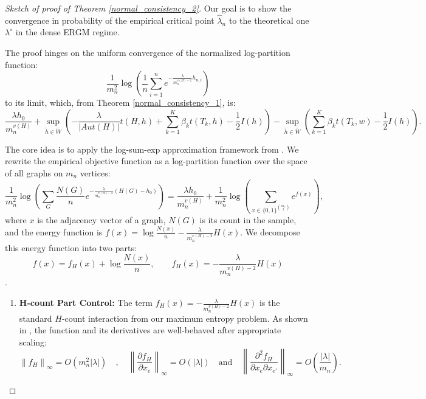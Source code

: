 \documentclass[12pt]{article}
\numberwithin{equation}{section}
\begin{document}
\begin{proof}[Sketch of proof of Theorem \ref{normal_consistency_2}]
 Our goal is to show the convergence in probability of the empirical critical point $\hat{\lambda}_n$ to the theoretical one $\lambda^{\circ}$ in the dense ERGM regime.

The proof hinges on the uniform convergence of the normalized log-partition function:
\[
\frac{1}{m_n^2}\log\left(\frac{1}{n}\sum_{i=1}^n e^{-\frac{\lambda}{m_n^{v(H)-2}} h_{n,i}}\right)
\]
to its limit, which, from Theorem \ref{normal_consistency_1}, is:
\[
\frac{\lambda h_0}{m_n^{v(H)}} + \sup_{\tilde{h}\in\tilde{W}}\left(-\frac{\lambda}{|Aut(H)|} t(H,h) + \sum_{k=1}^K \beta_k t(T_k, h) - \frac{1}{2}I(h) \right) - \sup_{\tilde{h}\in\tilde{W}}\left(\sum_{k=1}^K \beta_k t(T_k, w) - \frac{1}{2}I(h) \right).
\]

The core idea is to apply the log-sum-exp approximation framework from \cite{chatterjee2016nonlinear}. We rewrite the empirical objective function as a log-partition function over the space of all graphs on $m_n$ vertices:
\[
\frac{1}{m_n^2}\log\left(\sum_{G} \frac{N(G)}{n} e^{-\frac{\lambda}{m_n^{v(H)-2}} (H(G)-h_0)}\right) = \frac{\lambda h_0}{m_n^{v(H)}} + \frac{1}{m_n^2} \log \left(\sum_{x \in \{0,1\}^{\binom{m_n}{2}}} e^{f(x)}\right),
\]
where $x$ is the adjacency vector of a graph, $N(G)$ is its count in the sample, and the energy function is $f(x) = \log\frac{N(x)}{n} - \frac{\lambda}{m_n^{v(H)-2}} H(x)$. We decompose this energy function into two parts: 
$$f(x) = f_H(x) + \log\frac{N(x)}{n},\quad \quad f_H(x) = -\frac{\lambda}{m_n^{v(H)-2}}H(x)$$.

\begin{enumerate}
    \item \textbf{H-count Part Control:} The term $f_H(x) = -\frac{\lambda}{m_n^{v(H)-2}}H(x)$ is the standard $H$-count interaction from our maximum entropy problem. As shown in \cite{chatterjee2016nonlinear}, the function and its derivatives are well-behaved after appropriate scaling:
    \[
    \left\|f_H\right\|_\infty = O(m_n^2|\lambda|)\quad, \quad
    \left\|\frac{\partial f_H}{\partial x_e}\right\|_\infty = O(|\lambda|) \quad \text{and} \quad \left\|\frac{\partial^2 f_H}{\partial x_e\partial x_{e'}}\right\|_\infty = O\left(\frac{|\lambda|}{m_n}\right).
    \]



\end{enumerate}
\end{proof}
\end{document}
